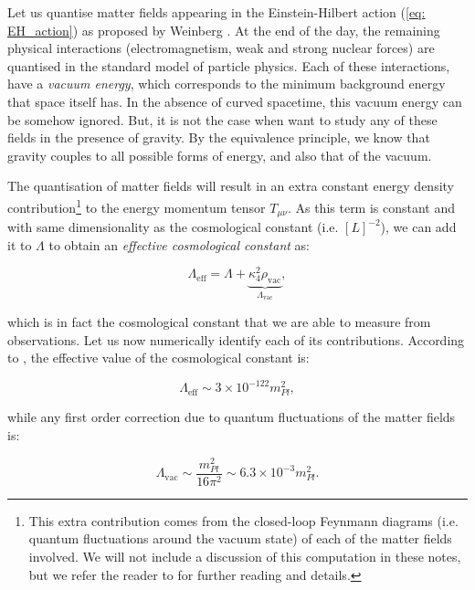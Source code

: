 \documentclass[11pt, a4paper]{article} %
\begin{document}
Let us quantise matter fields appearing in the Einstein-Hilbert action (\ref{eq: EH_action}) as proposed by Weinberg \cite{weinberg1989cosmological}. At the end of the day, the remaining physical interactions (electromagnetism, weak and strong nuclear forces) are quantised in the standard model of particle physics. Each of these interactions, have a \textit{vacuum energy}, which corresponds to the minimum background energy that space itself has. In the absence of curved spacetime, this vacuum energy can be somehow ignored. But, it is not the case when want to study any of these fields in the presence of gravity. By the equivalence principle, we know that gravity couples to all possible forms of energy, and also that of the vacuum.

The quantisation of matter fields will result in an extra constant energy density contribution\footnote{ This extra contribution comes from the closed-loop Feynmann diagrams (i.e. quantum fluctuations around the vacuum state) of each of the matter fields involved. We will not include a discussion of this computation in these notes, but we refer the reader to \cite{Martin_2012, padilla2015lectures} for further reading and details.} to the energy momentum tensor $T_{\mu\nu}$. As this term is constant and with same dimensionality as the cosmological constant (i.e. $[L]^{-2}$), we can add it to $\Lambda$ to obtain an \textit{effective cosmological constant} as:

\begin{equation}
	\Lambda_{\text{eff}} = \Lambda + \underbrace{\kappa^{2}_{4} \rho_{\text{vac}}}_{\Lambda_{\text{vac}}},
\end{equation}

which is in fact the cosmological constant that we are able to measure from observations. Let us now numerically identify each of its contributions. According to \cite{2020planck}, the effective value of the cosmological constant is:

\begin{equation}\label{eq: lambda_eff}
	\Lambda_{\text{eff}} \sim 3 \times 10^{-122} m^{2}_{Pl},
\end{equation}

while any first order correction due to quantum fluctuations of the matter fields is:

\begin{equation}\label{eq: lambda_vac}
	\Lambda_{\text{vac}} \sim \frac{m^{2}_{Pl}}{16 \pi^{2}} \sim 6.3 \times 10^{-3} m^{2}_{Pl}.
\end{equation}
\end{document}
